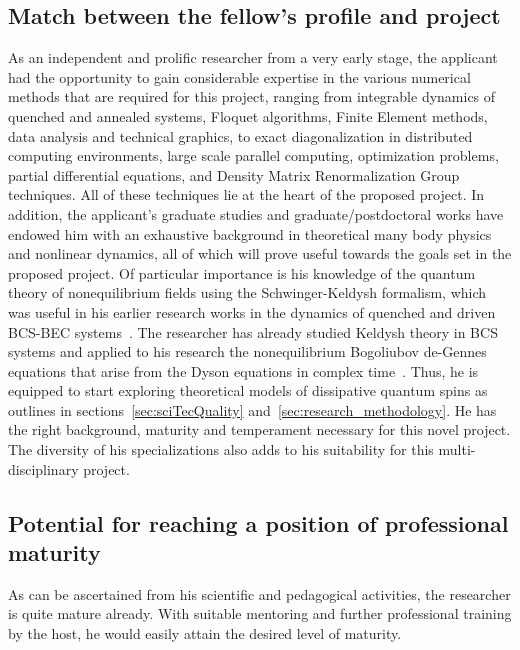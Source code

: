 \documentclass[a4paper,11pt,color]{article}
\begin{document}
\subsection{Match between the fellow's profile and project}
\label{sec:match}
As an independent and prolific researcher from a very early stage, the applicant had the opportunity to gain considerable expertise in the various numerical methods that are required for this project, ranging from integrable dynamics of quenched and annealed systems, Floquet algorithms, Finite Element methods, data analysis and technical graphics, to exact diagonalization in distributed computing environments, large scale parallel computing, optimization problems, partial differential equations, and Density Matrix Renormalization Group techniques. All of these techniques lie at the heart of the proposed project. In addition, the applicant's graduate studies and graduate/postdoctoral works have endowed him with an exhaustive background in theoretical many body physics and nonlinear dynamics, all of which will prove useful towards the goals set in the proposed project. Of particular importance is his knowledge of the quantum theory of nonequilibrium fields using the Schwinger-Keldysh formalism, which was 
useful 
in his earlier research works in the dynamics of quenched and driven BCS-BEC systems~\cite{colrev,ncnsd2012}.
The researcher has already studied Keldysh theory in BCS systems and applied to his research the nonequilibrium Bogoliubov de-Gennes equations that arise from the Dyson equations in complex time~\cite{fermidyn, ncnsd2012}. Thus, he is equipped to  start exploring theoretical models of dissipative quantum spins as outlines in sections~\ref{sec:sciTecQuality} and~\ref{sec:research_methodology}. He has the right background, maturity and temperament necessary for this novel project. The diversity of his specializations also adds to his suitability for this multi-disciplinary project.
   
\subsection{Potential for reaching a position of professional maturity}
\label{sec:potential_position}
As can be ascertained from his scientific and pedagogical activities, the researcher is quite mature already. With suitable mentoring and further professional training by the host, he would easily attain the desired level of maturity.
\end{document}
